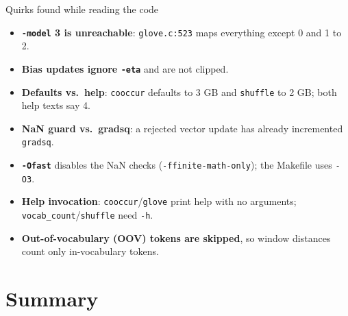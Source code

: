 \documentclass[aspectratio=169,11pt]{beamer}
\newcommand{\file}[1]{\texttt{#1}}
\newcommand{\opt}[1]{\texttt{-#1}}
\begin{document}
\begin{frame}{Quirks found while reading the code}
\small
\begin{itemize}
  \item[\textcolor{warn}{\textbullet}] \textbf{\opt{model} 3 is unreachable}: \file{glove.c:523} maps everything except 0 and 1 to 2.
  \item[\textcolor{warn}{\textbullet}] \textbf{Bias updates ignore \opt{eta}} and are not clipped.
  \item[\textcolor{warn}{\textbullet}] \textbf{Defaults vs.\ help}: \texttt{cooccur} defaults to 3 GB and \texttt{shuffle} to 2 GB; both help texts say 4.
  \item[\textcolor{warn}{\textbullet}] \textbf{NaN guard vs.\ gradsq}: a rejected vector update has already incremented \texttt{gradsq}.
  \item[\textcolor{warn}{\textbullet}] \textbf{\texttt{-Ofast}} disables the NaN checks (\texttt{-ffinite-math-only}); the Makefile uses \texttt{-O3}.
  \item[\textcolor{warn}{\textbullet}] \textbf{Help invocation}: \texttt{cooccur}/\texttt{glove} print help with no arguments; \texttt{vocab\_count}/\texttt{shuffle} need \texttt{-h}.
  \item[\textcolor{warn}{\textbullet}] \textbf{Out-of-vocabulary (OOV) tokens are skipped}, so window distances count only in-vocabulary tokens.
\end{itemize}
\end{frame}

\section{Summary}
\end{document}

